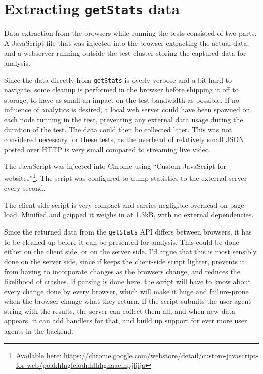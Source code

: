 \chapter{Extracting \texttt{getStats} data}\label{chp:getstats}

Data extraction from the browsers while running the tests consisted of two parts: A JavaScript file that was injected into the browser extracting the actual data, and a webserver running outside the test cluster storing the captured data for analysis.

Since the data directly from \texttt{getStats} is overly verbose and a bit hard to navigate, some cleanup is performed in the browser before shipping it off to storage, to have as small an impact on the test bandwidth as possible. If no influence of analytics is desired, a local web server could have been spawned on each node running in the test, preventing any external data usage during the duration of the test. The data could then be collected later. This was not considered necessary for these tests, as the overhead of relatively small JSON posted over HTTP is very small compared to streaming live video.

The JavaScript was injected into Chrome using ``Custom JavaScript for websites''\footnote{Available here: \url{https://chrome.google.com/webstore/detail/custom-javascript-for-web/poakhlngfciodnhlhhgnaaelnpjljija}}. The script was configured to dump statistics to the external server every second.

The client-side script is very compact and carries negligible overhead on page load. Minified and gzipped it weighs in at 1.3kB, with no external dependencies.

Since the returned data from the \texttt{getStats} API differs between browsers, it has to be cleaned up before it can be presented for analysis. This could be done either on the client side, or on the server side. I'd argue that this is most sensibly done on the server side, since if keeps the client-side script lighter, prevents it from having to incorporate changes as the browsers change, and reduces the likelihood of crashes. If parsing is done here, the script will have to know about every change done by every browser, which will make it huge and failure-prone when the browser change what they return. If the script submits the user agent string with the results, the server can collect them all, and when new data appears, it can add handlers for that, and build up support for ever more user agents in the backend.

